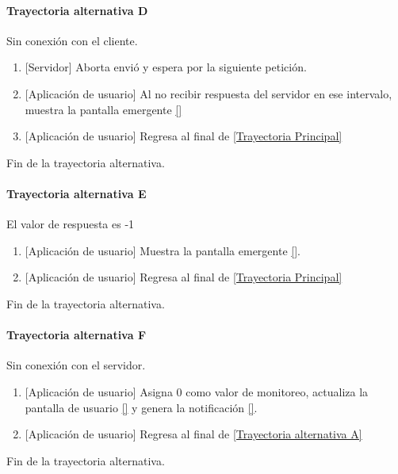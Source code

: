 \paragraph{Trayectoria alternativa D} \label{SUB-M-CU5:TD}
	Sin conexión con el cliente.
	\begin{enumerate}[label=D\arabic*.]
		\item {[Servidor]} Aborta envió y espera por la siguiente petición.
		\item {[Aplicación de usuario]} Al no recibir respuesta del servidor en ese intervalo, muestra la pantalla emergente \ref{}
		\item {[Aplicación de usuario]} Regresa al final de \hyperref[SUB-M-CU5:TP]{[Trayectoria Principal]}
	\end{enumerate}
	Fin de la trayectoria alternativa.
	
\paragraph{Trayectoria alternativa E} \label{SUB-M-CU5:TE}
	El valor de respuesta es -1
	\begin{enumerate}[label=E\arabic*.]
		\item {[Aplicación de usuario]} Muestra la pantalla emergente \ref{}.
		\item {[Aplicación de usuario]} Regresa al final de \hyperref[SUB-M-CU5:TP]{[Trayectoria Principal]}
	\end{enumerate}
	Fin de la trayectoria alternativa.
	
\paragraph{Trayectoria alternativa F} \label{SUB-M-CU5:TF}
	Sin conexión con el servidor.
	\begin{enumerate}[label=F\arabic*.]
		\item {[Aplicación de usuario]} Asigna 0 como valor de monitoreo, actualiza la pantalla de usuario \ref{}  y genera la notificación \ref{}.
		\item {[Aplicación de usuario]} Regresa al final de \hyperref[SUB-M-CU5:TA]{[Trayectoria alternativa A]}
	\end{enumerate}
	Fin de la trayectoria alternativa.
	

